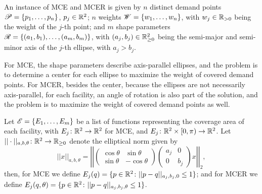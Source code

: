 


An instance of MCE and MCER is given by $n$ distinct demand points $\mathscr{P}=\{p_1, \dots, p_n\}$, $p_j\in\mathbb{R}^2$; $n$ weights $\mathscr{W}=\{w_1, \dots, w_n\}$, with $w_j\in\mathbb{R}_{>0}$ being the weight of the $j$-th point; and $m$ shape parameters $\mathscr{R}=\{(a_1, b_1), \dots, (a_m, b_m)\}$, with $(a_j, b_j)\in\mathbb{R}_{\ge0}^2$ being the semi-major and semi-minor axis of the $j$-th ellipse, with $a_j > b_j$.

For MCE, the shape parameters describe axis-parallel ellipses, and the problem is to determine a center for each ellipse to maximize the weight of covered demand points. For MCER, besides the center, because the ellipses are not necessarily axis-parallel, for each facility, an angle of rotation is also part of the solution, and the problem is to maximize the weight of covered demand points as well.

Let $\mathscr{E}=\{E_1, \dots, E_m\}$ be a list of functions representing the coverage area of each facility, with $E_j \colon \mathbb{R}^2 \to \mathbb{R}^2$ for MCE, and $E_j \colon \mathbb{R}^2\times [0, \pi)\to \mathbb{R}^2$. Let $||\cdot||_{a,b, \theta} \colon \mathbb{R}^2 \to \mathbb{R}_{\ge0}$ denote the elliptical norm given by
\begin{equation*}
||x||_{a,b, \theta}=\left|\left|
\left(\begin{array}{rr}
\cos{\theta} & \sin{\theta}\\
\sin{\theta} & -\cos{\theta}
\end{array}
\right)
\left(\begin{array}{cc}
a_j & 0\\
0 & b_j
\end{array}\right) x \right|\right|_2,
\end{equation*}
then, for MCE we define $E_j(q)=\{p \in \mathbb{R}^2 \colon ||p-q||_{a_j,b_j,0} \le 1\}$; and for MCER we define $E_j(q, \theta)=\{p \in \mathbb{R}^2 \colon ||p-q||_{a_j,b_j, \theta} \le 1\}$.

